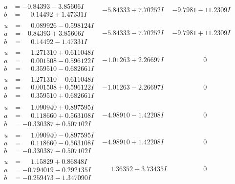 \documentclass[1p]{elsarticle_modified}
\theoremstyle{definition}
\begin{document}
$$\begin{array}{c|c|c}
\begin{aligned}
a &= -0.84393 - 3.85606 I \\
b &= \phantom{-}0.14492 + 1.47331 I\end{aligned}
 & -5.84333 + 7.70252 I & -9.7981 - 11.2309 I \\ \hline\begin{aligned}
u &= \phantom{-}0.089926 - 0.598124 I \\
a &= -0.84393 + 3.85606 I \\
b &= \phantom{-}0.14492 - 1.47331 I\end{aligned}
 & -5.84333 - 7.70252 I & -9.7981 + 11.2309 I \\ \hline\begin{aligned}
u &= \phantom{-}1.271310 + 0.611048 I \\
a &= \phantom{-}0.001508 - 0.596122 I \\
b &= \phantom{-}0.359510 - 0.682661 I\end{aligned}
 & -1.01263 + 2.26697 I & \phantom{-0.000000 } 0 \\ \hline\begin{aligned}
u &= \phantom{-}1.271310 - 0.611048 I \\
a &= \phantom{-}0.001508 + 0.596122 I \\
b &= \phantom{-}0.359510 + 0.682661 I\end{aligned}
 & -1.01263 - 2.26697 I & \phantom{-0.000000 } 0 \\ \hline\begin{aligned}
u &= \phantom{-}1.090940 + 0.897595 I \\
a &= \phantom{-}0.118660 + 0.563108 I \\
b &= -0.330387 + 0.507102 I\end{aligned}
 & -4.98910 - 1.42208 I & \phantom{-0.000000 } 0 \\ \hline\begin{aligned}
u &= \phantom{-}1.090940 - 0.897595 I \\
a &= \phantom{-}0.118660 - 0.563108 I \\
b &= -0.330387 - 0.507102 I\end{aligned}
 & -4.98910 + 1.42208 I & \phantom{-0.000000 } 0 \\ \hline\begin{aligned}
u &= \phantom{-}1.15829 + 0.86848 I \\
a &= -0.794019 - 0.292135 I \\
b &= -0.259473 - 1.347090 I\end{aligned}
 & \phantom{-}1.36352 + 3.73435 I & \phantom{-0.000000 } 0 \\ \hline\begin{aligned}

\end{aligned}
\end{array}$$
\end{document}
